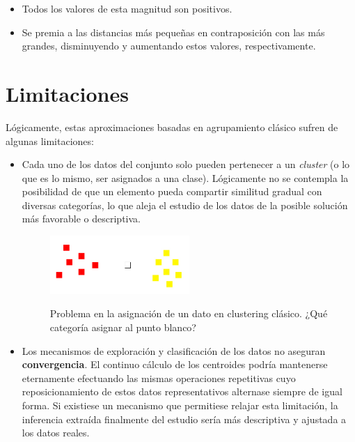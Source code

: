 \documentclass[]{report}
\begin{document}
				\begin{itemize}
					\item Todos los valores de esta magnitud son positivos.
					\item Se premia a las distancias más pequeñas en contraposición con las más grandes, disminuyendo y aumentando estos valores, respectivamente.
				\end{itemize}
				
		\section{Limitaciones}
		
			Lógicamente, estas aproximaciones basadas en agrupamiento clásico sufren de algunas limitaciones:
			
			\begin{itemize}
				\item Cada uno de los datos del conjunto solo pueden pertenecer a un \textit{cluster} (o lo que es lo mismo, ser asignados a una clase). Lógicamente no se contempla la posibilidad de que un elemento pueda compartir similitud gradual con diversas categorías, lo que aleja el estudio de los datos de la posible solución más favorable o descriptiva.
				
				\begin{figure}[h]
					\centering
					\includegraphics[width=0.5\textwidth]{Artboard1.jpg}
					\label{clustering2}
					\caption{Problema en la asignación de un dato en clustering clásico. ¿Qué categoría asignar al punto blanco?}
				\end{figure}
			
				\item Los mecanismos de exploración y clasificación de los datos no aseguran \textbf{convergencia}. El continuo cálculo de los centroides podría mantenerse eternamente efectuando las mismas operaciones repetitivas cuyo reposicionamiento de estos datos representativos alternase siempre de igual forma. Si existiese un mecanismo que permitiese relajar esta limitación, la inferencia extraída finalmente del estudio sería más descriptiva y ajustada a los datos reales.
			\end{itemize}
	
\end{document}
